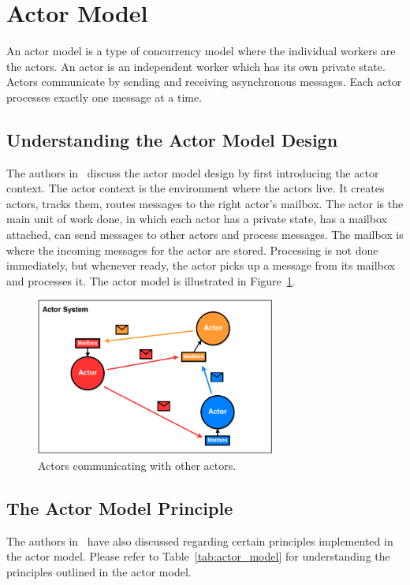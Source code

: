 \section{Actor Model\label{sec:actor}}
An actor model is a type of concurrency model where the individual workers are the actors. An actor is an independent worker which has its own private state. Actors communicate by sending and receiving asynchronous messages. Each actor processes exactly one message at a time.

\subsection{Understanding the Actor Model Design}
The authors in~\cite{8316391} discuss the actor model design by first introducing the actor context. The actor context is the environment where the actors live. It creates actors, tracks them, routes messages to the right actor's mailbox.  The actor is the main unit of work done, in which each actor has a private state, has a mailbox attached, can send messages to other actors and process messages. The mailbox is where the incoming messages for the actor are stored. Processing is not done immediately, but whenever ready, the actor picks up a message from its mailbox and processes it. 
The actor model is illustrated in Figure~\ref{fig:actor}. 
\begin{figure}[H]
    \centering
    \includegraphics[width=0.7\textwidth]{actor.png}
    \caption{Actors communicating with other actors.}
    \label{fig:actor}
\end{figure}
\subsection{The Actor Model Principle}
The authors in~\cite{8316391} have also discussed regarding certain principles implemented in the actor model. Please refer to Table~\ref{tab:actor_model} for understanding the principles outlined in the actor model.

